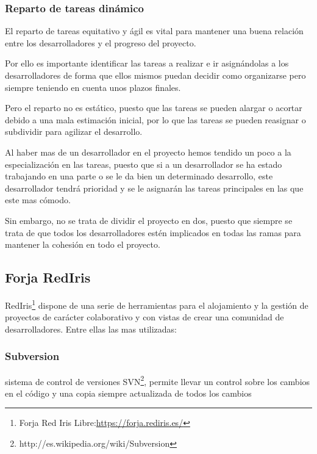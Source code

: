 \subsubsection*{Reparto de tareas dinámico}
El reparto de tareas equitativo y ágil es vital para mantener una buena
relación entre los desarrolladores y el progreso del proyecto.

Por ello es importante identificar las tareas a realizar e ir asignándolas a
los desarrolladores de forma que ellos mismos puedan decidir como organizarse
pero siempre teniendo en cuenta unos plazos finales.

Pero el reparto no es estático, puesto que las tareas se pueden alargar o
acortar debido a una mala estimación inicial, por lo que las tareas se pueden
reasignar o subdividir para agilizar el desarrollo.

Al haber mas de un desarrollador en el proyecto hemos tendido un poco a la
especialización en las tareas, puesto que si a un desarrollador se ha estado
trabajando en una parte o se le da bien un determinado desarrollo, este
desarrollador tendrá prioridad y se le asignarán las tareas principales en las
que este mas cómodo.

Sin embargo, no se trata de dividir el proyecto en dos, puesto que siempre se
trata de que todos los desarrolladores estén implicados en todas las ramas
para mantener la cohesión en todo el proyecto.

\subsection*{Forja RedIris}
RedIris\footnote{Forja Red Iris Libre:\url{https://forja.rediris.es/}} dispone
de una serie de
herramientas para el alojamiento y la gestión de proyectos de carácter
colaborativo y con vistas de crear una comunidad de desarrolladores.
Entre ellas las mas utilizadas:
\subsubsection*{Subversion}
sistema de control de versiones
SVN\footnote{http://es.wikipedia.org/wiki/Subversion}, permite llevar un
control sobre los cambios en el código y una copia siempre actualizada de
todos los cambios
